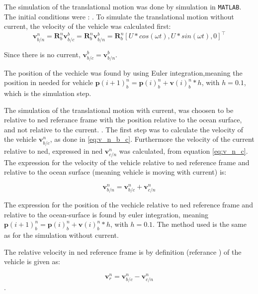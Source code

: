 The simulation of the translational motion was done by simulation in \texttt{MATLAB}. The initial conditions were : . To simulate the translational motion without current, the velocity of the vehicle was calculated first:
\begin{equation}
    \mathbf{v}^n_{b/n} = \mathbf{R}^n_b \mathbf{v}^b_{b/c} =\mathbf{R}^n_b \mathbf{v}^b_{b/n} = \mathbf{R}^n_b [U*cos(\omega t), U*sin(\omega t), 0]^\top
    \label{eq:v_n_b_c}
\end{equation}

Since there is no current, $\mathbf{v}^b_{b/c} = \mathbf{v}^b_{b/n}$.

The position of the vechicle was found by using Euler integration,meaning the position in needed for vehicle $\mathbf{p}(i+1)^n_b = \mathbf{p}(i)^n_b + \mathbf{v}(i)^n_b*h $, with $h = 0.1$, which is the simulation step.
 
The  simulation of the translational motion with current, was choosen to be relative to ned referance frame with the position relative to the ocean surface, and not relative to the current. . The first step was to calculate the velocity of the vehicle $\mathbf{v}^n_{b/c}$, as done in \eqref{eq:v_n_b_c}. Furthermore the velocity of the current relative to ned, expressed in ned $\mathbf{v}^n_{c/n}$ was calculated, from equation \eqref{eq:v_n_c}. The expression for the velocity of the vehicle relative to ned reference frame and relative to the ocean surface (meaning vehicle is moving with current) is:

\begin{equation}
    \mathbf{v}^n_{b/n} = \mathbf{v}^n_{b/c} + \mathbf{v}^n_{c/n}
\end{equation}

The expression for the position of the vechicle relative to ned reference frame and relative to the ocean-surface is found by euler integration, meaning $\mathbf{p}(i+1)^n_b = \mathbf{p}(i)^n_b + \mathbf{v}(i)^n_b*h $, with $h = 0.1$. The method used is the same as for the simulation without current.

The relative velocity  in ned reference frame is by definition (referance \cite{Fossen2011} ) of the vehicle is given as:

\begin{equation}
    \mathbf{v}^n_{r} = \mathbf{v}^n_{b/c} - \mathbf{v}^n_{c/n}
    \label{eq:v_n_r}
\end{equation}.


